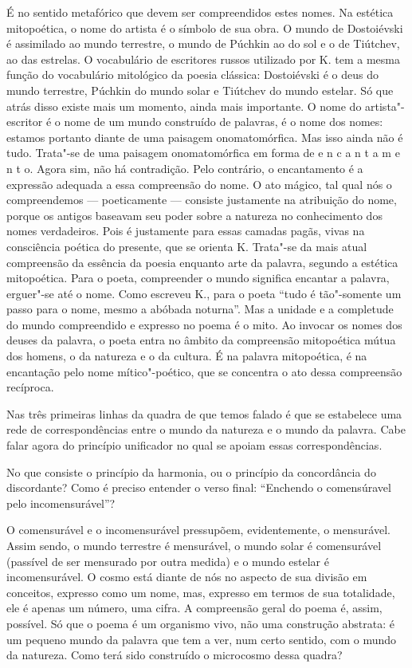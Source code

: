 É no sentido metafórico que devem ser compreendidos estes nomes. Na
estética mitopoética, o nome do artista é o símbolo de sua obra. O mundo
de Dostoiévski é assimilado ao mundo terrestre, o mundo de Púchkin ao do
sol e o de Tiútchev, ao das estrelas. O vocabulário de escritores russos
utilizado por K. tem a mesma função do vocabulário mitológico da poesia
clássica: Dostoiévski é o deus do mundo terrestre, Púchkin do mundo
solar e Tiútchev do mundo estelar. Só que atrás disso existe mais um
momento, ainda mais importante. O nome do artista"-escritor é o nome de
um mundo construído de palavras, é o nome dos nomes: estamos portanto
diante de uma paisagem onomatomórfica. Mas isso ainda não é tudo.
Trata"-se de uma paisagem onomatomórfica em forma de e n c a n t a m e n
t o. Agora sim, não há contradição. Pelo contrário, o encantamento é a
expressão adequada a essa compreensão do nome. O ato mágico, tal qual
nós o compreendemos --- poeticamente --- consiste justamente na
atribuição do nome, porque os antigos baseavam seu poder sobre a
natureza no conhecimento dos nomes verdadeiros. Pois é justamente para
essas camadas pagãs, vivas na consciência poética do presente, que se
orienta K. Trata"-se da mais atual compreensão da essência da poesia
enquanto arte da palavra, segundo a estética mitopoética. Para o poeta,
compreender o mundo significa encantar a palavra, erguer"-se até o nome.
Como escreveu K., para o poeta ``tudo é tão"-somente um passo para o
nome, mesmo a abóbada noturna''. Mas a unidade e a completude do mundo
compreendido e expresso no poema é o mito. Ao invocar os nomes dos
deuses da palavra, o poeta entra no âmbito da compreensão mitopoética
mútua dos homens, o da natureza e o da cultura. É na palavra
mitopoética, é na encantação pelo nome mítico"-poético, que se concentra
o ato dessa compreensão recíproca.

Nas três primeiras linhas da quadra de que temos falado é que se
estabelece uma rede de correspondências entre o mundo da natureza e o
mundo da palavra. Cabe falar agora do princípio unificador no qual se
apoiam essas correspondências.

No que consiste o princípio da harmonia, ou o princípio da concordância
do discordante? Como é preciso entender o verso final: ``Enchendo o
comensúravel pelo incomensurável''?

O comensurável e o incomensurável pressupõem, evidentemente, o
mensurável. Assim sendo, o mundo terrestre é mensurável, o mundo solar é
comensurável (passível de ser mensurado por outra medida) e o mundo
estelar é incomensurável. O cosmo está diante de nós no aspecto de sua
divisão em conceitos, expresso como um nome, mas, expresso em termos de
sua totalidade, ele é apenas um número, uma cifra. A compreensão geral do
poema é, assim, possível. Só que o poema é um organismo vivo, não uma
construção abstrata: é um pequeno mundo da palavra que tem a ver, num
certo sentido, com o mundo da natureza. Como terá sido construído o
microcosmo dessa quadra?

